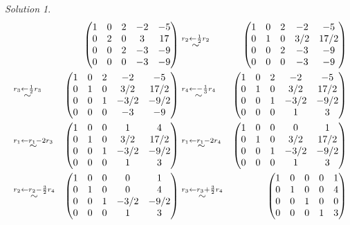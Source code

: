 \documentclass[
]{book}
\theoremstyle{definition}
\theoremstyle{definition}
\theoremstyle{definition}
\theoremstyle{remark}
\newtheorem*{solution}{Solution}
\begin{document}
\begin{solution}
\[
\begin{aligned}
& & \begin{pmatrix} 1 & 0 & 2 & -2 & -5 \\ 0 & 2 & 0 & 3 & 17 \\ 0 & 0 & 2 & -3 & -9 \\ 0 & 0 & 0 & -3 & -9 \end{pmatrix} & \stackrel{r_2 \leftarrow \frac{1}{2} r_2}{\huge \sim} & \begin{pmatrix} 1 & 0 & 2 & -2 & -5 \\ 0 & 1 & 0 & 3/2 & 17/2 \\ 0 & 0 & 2 & -3 & -9 \\ 0 & 0 & 0 & -3 & -9 \end{pmatrix} \\
& \stackrel{r_3 \leftarrow \frac{1}{2} r_3}{\huge \sim} & \begin{pmatrix} 1 & 0 & 2 & -2 & -5 \\ 0 & 1 & 0 & 3/2 & 17/2 \\ 0 & 0 & 1 & -3/2 & -9/2 \\ 0 & 0 & 0 & -3 & -9 \end{pmatrix} & \stackrel{r_4 \leftarrow - \frac{1}{3} r_4}{\huge \sim} & \begin{pmatrix} 1 & 0 & 2 & -2 & -5 \\ 0 & 1 & 0 & 3/2 & 17/2 \\ 0 & 0 & 1 & -3/2 & -9/2 \\ 0 & 0 & 0 & 1 & 3 \end{pmatrix} \\
& \stackrel{r_1 \leftarrow r_1 -2  r_3}{\huge \sim} & \begin{pmatrix} 1 & 0 & 0 & 1 & 4 \\ 0 & 1 & 0 & 3/2 & 17/2 \\ 0 & 0 & 1 & -3/2 & -9/2 \\ 0 & 0 & 0 & 1 & 3 \end{pmatrix} & \stackrel{r_1 \leftarrow r_1 - 2 r_4}{\huge \sim} & \begin{pmatrix} 1 & 0 & 0 & 0 & 1 \\ 0 & 1 & 0 & 3/2 & 17/2 \\ 0 & 0 & 1 & -3/2 & -9/2 \\ 0 & 0 & 0 & 1 & 3 \end{pmatrix} \\
& \stackrel{r_2 \leftarrow r_2 - \frac{3}{2} r_4}{\huge \sim} & \begin{pmatrix} 1 & 0 & 0 & 0 & 1 \\ 0 & 1 & 0 & 0 & 4 \\ 0 & 0 & 1 & -3/2 & -9/2 \\ 0 & 0 & 0 & 1 & 3 \end{pmatrix} & 
\stackrel{r_3 \leftarrow r_3 + \frac{3}{2} r_4}{\huge \sim} & \begin{pmatrix} 1 & 0 & 0 & 0 & 1 \\ 0 & 1 & 0 & 0 & 4 \\ 0 & 0 & 1 & 0 & 0 \\ 0 & 0 & 0 & 1 & 3 \end{pmatrix} 
\end{aligned}
\]


\end{solution}
\end{document}
